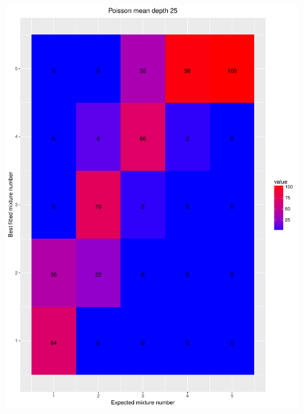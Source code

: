 \documentclass[11pt]{article}
\begin{document}
\begin{figure}[H]
\begin{center}
\includegraphics[scale=0.27]{../Results/Second_Analysis/Poisson_Confusion_Matrix_25.pdf}

\end{center}
\end{figure}
\end{document}
